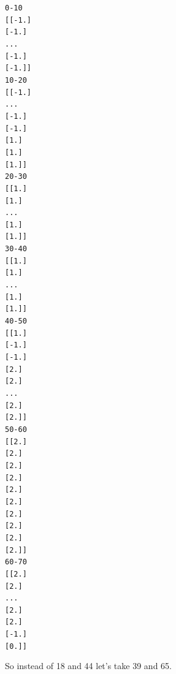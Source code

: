 \documentclass[letterpaper,10pt,english]{/usr/share/sphinx/texinputs/sphinxhowto}
\newenvironment{InvisibleVerbatim}
        {\begin{mdframed}[leftmargin=0.1\linewidth,innerleftmargin=3pt,innerrightmargin=3pt, userdefinedwidth=1\linewidth, linewidth=0pt, linecolor=white, usetwoside=false]}
        {\end{mdframed}}
\begin{document}
    

        
        

            
                \begin{InvisibleVerbatim}
                \vspace{-0.5\baselineskip}
\begin{alltt} 0 - 10
[[-1.]
 [-1.]
 ...
 [-1.]
 [-1.]]
10 - 20
[[-1.]
 ...
 [-1.]
 [-1.]
 [ 1.]
 [ 1.]
 [ 1.]]
20 - 30
[[ 1.]
 [ 1.]
 ...
 [ 1.]
 [ 1.]]
30 - 40
[[ 1.]
 [ 1.]
 ...
 [ 1.]
 [ 1.]]
40 - 50
[[ 1.]
 [-1.]
 [-1.]
 [ 2.]
 [ 2.]
 ...
 [ 2.]
 [ 2.]]
50 - 60
[[ 2.]
 [ 2.]
 [ 2.]
 [ 2.]
 [ 2.]
 [ 2.]
 [ 2.]
 [ 2.]
 [ 2.]
 [ 2.]]
60 - 70
[[ 2.]
 [ 2.]
 ...
 [ 2.]
 [ 2.]
 [-1.]
 [ 0.]]
\end{alltt}

            \end{InvisibleVerbatim}
            
        
    
So instead of 18 and 44 let's take 39 and 65.

\end{document}
